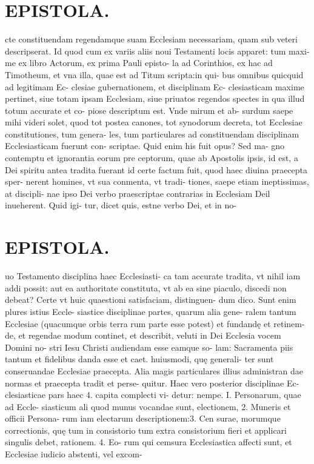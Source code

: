 \documentclass{article}
\begin{document}
\begin{pages}
\section*{EPISTOLA. }cte constituendam regendamque suam Ecclesiam necessariam, quam sub veteri descripserat. Id quod cum ex variis aliis noui Testamenti locis apparet: tum maxi- me ex libro Actorum, ex prima Pauli episto- la ad Corinthios, ex hac ad Timotheum, et vna illa, quae est ad Titum scripta:in qui- bus omnibus quicquid ad legitimam Ec- clesiae gubernationem, et disciplinam Ec- clesiasticam maxime pertinet, siue totam ipsam Ecclesiam, siue priuatos regendos spectes in qua illud totum accurate et co- piose descriptum est. Vnde mirum et ab- surdum saepe mihi videri solet, quod tot postea canones, tot synodorum decreta, tot Ecclesiae constitutiones, tum genera- les, tum particulares ad constituendam disciplinam Ecclesiasticam fuerunt con- scriptae. Quid enim his fuit opus? Sed ma- gno contemptu et ignorantia eorum pre ceptorum, quae ab Apostolis ipsis, id est, a Dei spiritu antea tradita fuerant id certe factum fuit, quod haec diuina praecepta sper- nerent homines, vt sua conmenta, vt tradi- tiones, saepe etiam ineptissimas, at discipli- nae ipso Dei verbo praescriptae contrarias in Ecclesiam Deil inueherent. Quid igi- tur, dicet quis, estne verbo Dei, et in no- 
\section*{EPISTOLA. }uo Testamento disciplina haec Ecclesiasti- ca tam accurate tradita, vt nihil iam addi possit: aut ea authoritate constituta, vt ab ea sine piaculo, discedi non debeat? Certe vt huic quaestioni satisfaciam, distinguen- dum dico. Sunt enim plures istius Eccle- siastice disciplinae partes, quarum alia gene- ralem tantum Ecclesiae (quacumque orbis terra rum parte esse potest) et fundandę et retinem- de, et regendae modum continet, et describit, veluti in Dei Ecclesia vocem Domini no- stri Iesu Christi audiendam esse eamque so- lam: Sacramenta piis tantum et fidelibus danda esse et caet. huiusmodi, quę generali- ter sunt conseruandae Ecclesiae praecepta. Alia magis particulares illius administran dae normas et praecepta tradit et perse- quitur. Haec vero posterior disciplinae Ec- clesiasticae pars haec 4. capita complecti vi- detur: nempe. I. Personarum, quae ad Eccle- siasticum ali quod munus vocandae sunt, electionem, 2. Muneris et officii Persona- rum iam electarum descriptionem:3. Cen surae, morumque correctionis, quę tum in consistorio tum extra consistorium fieri et applicari singulis debet, rationem. 4. Eo- rum qui cemsura Ecclesiastica affecti sunt, et Ecclesiae iudicio abstenti, vel excom- 

\end{pages}
\end{document}

